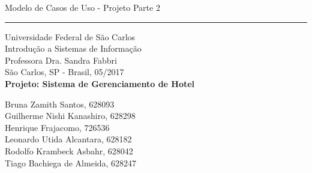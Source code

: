 \documentclass[notitlepage]{article}
\begin{document}
\begin{flushright}
    \begin{bfseries}
        \Huge{Modelo de Casos de Uso - Projeto Parte 2}\\
    \end{bfseries}
    \rule{16cm}{3pt}\vskip1cm
\end{flushright}

	\begin{center}
		\large{Universidade Federal de São Carlos}\\
		\large{Introdução a Sistemas de Informação}\\ 
		\large{Professora Dra. Sandra Fabbri}\\
		\large{São Carlos, SP - Brasil, 05/2017}\\
        \vspace{45pt}
        \textbf{\LARGE{Projeto: Sistema de Gerenciamento de Hotel}}\\
		\vspace{1,5cm}
	\end{center}
	
	\begin{flushleft}
		\begin{tabbing}
		Bruna Zamith Santos, 628093\\
		Guilherme Nishi Kanashiro, 628298\\
		Henrique Frajacomo, 726536\\
		Leonardo Utida Alcantara, 628182\\
		Rodolfo Krambeck Asbahr, 628042\\
		Tiago Bachiega de Almeida, 628247
	\end{tabbing}
 \end{flushleft}
	\vspace{1cm}
\nopagebreak


\clearpage
\end{document}

